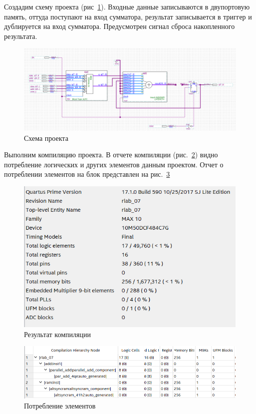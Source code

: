 \documentclass[a4paper,14pt]{article}
\begin{document}
Создадим схему проекта (рис~\ref{fig:schema}).
Входные данные записываются в двупортовую память, оттуда поступают на вход сумматора, результат записывается в триггер и дублируется на вход сумматора.
Предусмотрен сигнал сброса накопленного результата.

\begin{figure}[H]
	\centering
	\includegraphics[width=\linewidth]{image/schema}
	\caption{Схема проекта}
	\label{fig:schema}
\end{figure}

Выполним компиляцию проекта.
В отчете компиляции (рис.~\ref{fig:report}) видно потребление логических и других элементов данным проектом.
Отчет о потреблении элементов на блок представлен на рис.~\ref{fig:elements}

\begin{figure}[H]
	\centering
	\includegraphics[width=0.6\linewidth]{image/report}
	\caption{Результат компиляции}
	\label{fig:report}
\end{figure}

\begin{figure}[H]
	\centering
	\includegraphics[width=0.6\linewidth]{image/elements}
	\caption{Потребление элементов}
	\label{fig:elements}
\end{figure}
\end{document}
